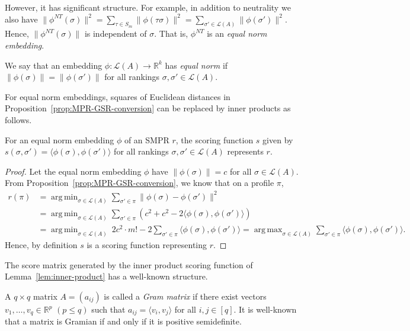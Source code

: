 \documentclass[prodmode,acmec]{ec-acmsmall}
\newcommand{\calL}{{\mathcal{L}}}
\newcommand{\rank}{{\calL(A)}}
\DeclareMathOperator*{\argmax}{arg\,max}
\DeclareMathOperator*{\argmin}{arg\,min}
\newcommand{\nt}{NT}
\begin{document}
However, it has significant structure. For example, in addition to neutrality we also have $\|\phi^{\nt}(\sigma)\|^2 = \sum_{\tau \in S_m} \|\phi(\tau \sigma)\|^2 = \sum_{\sigma' \in \rank} \|\phi(\sigma')\|^2$. 
Hence, $\|\phi^{\nt}(\sigma)\|$ is independent of $\sigma$. That is, $\phi^{\nt}$ is an \emph{equal norm embedding}.
%
\begin{definition}
We say that an embedding $\phi : \rank \rightarrow \mathbb{R}^k$ has \emph{equal norm} if $\|\phi(\sigma)\| = \|\phi(\sigma')\|$ for all rankings $\sigma,\sigma' \in \rank$.
\end{definition}
%
For equal norm embeddings, squares of Euclidean distances in Proposition~\ref{prop:MPR-GSR-conversion} can be replaced by inner products as follows.
\begin{lemma}
For an equal norm embedding $\phi$ of an SMPR $r$, the scoring function $s$ given by $s(\sigma,\sigma') = \langle \phi(\sigma),\phi(\sigma') \rangle$ for all rankings $\sigma,\sigma' \in \rank$ represents $r$. 
\label{lem:inner-product}
\end{lemma}
\begin{proof}
Let the equal norm embedding $\phi$ have $\|\phi(\sigma)\| = c$ for all $\sigma \in \rank$. From Proposition~\ref{prop:MPR-GSR-conversion}, we know that on a profile $\pi$, 
\begin{align*}
r(\pi) &= \argmin_{\sigma \in \rank} \sum_{\sigma' \in \pi} \|\phi(\sigma)-\phi(\sigma')\|^2 \\
&= \argmin_{\sigma \in \rank} \sum_{\sigma' \in \pi} \left( c^2 + c^2 - 2 \langle \phi(\sigma), \phi(\sigma')\rangle\right) \\
&= \argmin_{\sigma \in \rank}\: 2 c^2\cdot m! - 2 \sum_{\sigma' \in \pi} \langle \phi(\sigma), \phi(\sigma')\rangle = \argmax_{\sigma \in \rank} \sum_{\sigma' \in \pi} \langle \phi(\sigma), \phi(\sigma')\rangle.
\end{align*}
Hence, by definition $s$ is a scoring function representing $r$. 
\end{proof}
%
The score matrix generated by the inner product scoring function of Lemma~\ref{lem:inner-product} has a well-known structure. 
\begin{definition}
A $q \times q$ matrix $A = (a_{ij})$ is called a \emph{Gram matrix} if there exist vectors $v_1,\ldots,v_q \in \mathbb{R}^p$ $(p \leq q)$ such that $a_{ij} = \langle v_i,v_j \rangle$ for all $i,j \in [q]$. It is well-known that a matrix is Gramian if and only if it is positive semidefinite. 
\end{definition}
\end{document}
